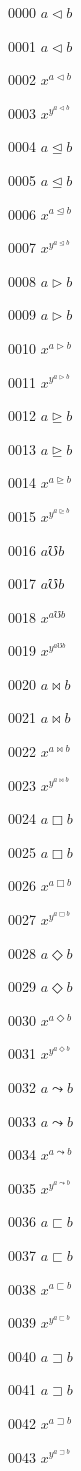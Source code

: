 \documentclass{article}
\begin{document}
0000 $a\lhd b$\par
0001 $\displaystyle a\lhd b$\par
0002 $x^{a\lhd b}$\par
0003 $x^{y^{a\lhd b}}$\par
0004 $a\unlhd b$\par
0005 $\displaystyle a\unlhd b$\par
0006 $x^{a\unlhd b}$\par
0007 $x^{y^{a\unlhd b}}$\par
0008 $a\rhd b$\par
0009 $\displaystyle a\rhd b$\par
0010 $x^{a\rhd b}$\par
0011 $x^{y^{a\rhd b}}$\par
0012 $a\unrhd b$\par
0013 $\displaystyle a\unrhd b$\par
0014 $x^{a\unrhd b}$\par
0015 $x^{y^{a\unrhd b}}$\par
0016 $a\mho b$\par
0017 $\displaystyle a\mho b$\par
0018 $x^{a\mho b}$\par
0019 $x^{y^{a\mho b}}$\par
0020 $a\Join b$\par
0021 $\displaystyle a\Join b$\par
0022 $x^{a\Join b}$\par
0023 $x^{y^{a\Join b}}$\par
0024 $a\Box b$\par
0025 $\displaystyle a\Box b$\par
0026 $x^{a\Box b}$\par
0027 $x^{y^{a\Box b}}$\par
0028 $a\Diamond b$\par
0029 $\displaystyle a\Diamond b$\par
0030 $x^{a\Diamond b}$\par
0031 $x^{y^{a\Diamond b}}$\par
0032 $a\leadsto b$\par
0033 $\displaystyle a\leadsto b$\par
0034 $x^{a\leadsto b}$\par
0035 $x^{y^{a\leadsto b}}$\par
0036 $a\sqsubset b$\par
0037 $\displaystyle a\sqsubset b$\par
0038 $x^{a\sqsubset b}$\par
0039 $x^{y^{a\sqsubset b}}$\par
0040 $a\sqsupset b$\par
0041 $\displaystyle a\sqsupset b$\par
0042 $x^{a\sqsupset b}$\par
0043 $x^{y^{a\sqsupset b}}$\par
\end{document}
